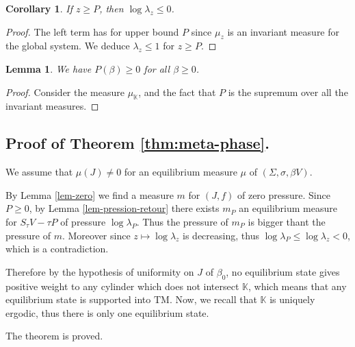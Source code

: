 \documentclass[11 pt]{article}
\newtheorem{lemma}[proposition]{Lemma}
\newtheorem{corollary}[proposition]{Corollary}
\newcommand{\BBone}{{1\!\!1}}
\theoremstyle{definition}
\begin{document}
\begin{corollary}
If $z\geq P$, then $\log\lambda_z\leq 0$.
\end{corollary}
\begin{proof}
The left term has for upper bound $P$ since $\mu_z$ is an invariant measure for the global system. We deduce  $\lambda_z\leq 1$ for $z\geq P$.
\end{proof}


\begin{lemma}
We have $P(\beta) \geq 0$ for all $\beta\geq 0$.
\end{lemma}
\begin{proof}
Consider the measure $\mu_{\mathbb K}$, and the fact that $P$ is the supremum over all the invariant measures.
\end{proof}


\subsection{Proof of Theorem \ref{thm:meta-phase}.} 

We assume that $\mu(J)\neq 	0$ for an equilibrium measure $\mu$ of $(\Sigma,\sigma,\beta V)$. 

By Lemma \ref{lem-zero} we find a measure $m$ for $(J,f)$ of zero pressure. Since $P\geq 0$, by Lemma \ref{lem-pression-retour} there exists $m_P$ an equilibrium measure for $S_\tau V-\tau P$ of pressure $\log\lambda_P$. 
Thus the pressure of $m_P$ is bigger thant the pressure of $m$. Moreover since $z\mapsto \log \lambda_z$ is decreasing, thus $\log \lambda_P\leq \log\lambda_z<0$, which is a contradiction.


Therefore by the hypothesis of uniformity on $J$ of $\beta_0$, no equilibrium state gives positive weight to any cylinder which does not intersect $\mathbb{K}$, which means that any equilibrium state is supported into $\mathrm{TM}$. Now, we recall that $\mathbb{K}$ is uniquely ergodic, thus there is only one equilibrium state.

The theorem is proved.



\end{document}
